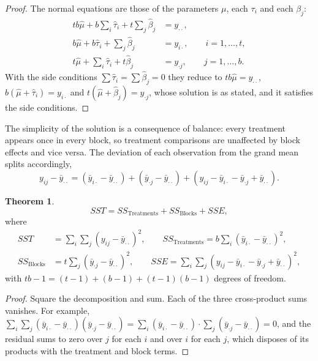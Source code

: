 \documentclass[11pt,a4paper]{article}
\numberwithin{equation}{section}
\theoremstyle{definition}
\newtheorem{thm}{Theorem}[subsection]
\begin{document}
\begin{proof}
The normal equations are those of the parameters $\mu$, each $\tau_i$ and each $\beta_j$:
\begin{align*}
tb\hat\mu + b\sum_i\hat\tau_i + t\sum_j\hat\beta_j &= y_{\cdot\cdot} , \\
b\hat\mu + b\hat\tau_i + \sum_j\hat\beta_j &= y_{i\cdot} , \qquad i = 1, \dots, t , \\
t\hat\mu + \sum_i\hat\tau_i + t\hat\beta_j &= y_{\cdot j} , \qquad j = 1, \dots, b .
\end{align*}
With the side conditions $\sum\hat\tau_i = \sum\hat\beta_j = 0$ they reduce to $tb\hat\mu = y_{\cdot\cdot}$, $b(\hat\mu + \hat\tau_i) = y_{i\cdot}$ and $t(\hat\mu + \hat\beta_j) = y_{\cdot j}$, whose solution is as
stated, and it satisfies the side conditions.
\end{proof}

The simplicity of the solution is a consequence of balance: every treatment appears once in every block, so treatment comparisons are
unaffected by block effects and vice versa. The deviation of each observation from the grand mean splits accordingly,
\[
y_{ij} - \bar y_{\cdot\cdot} = (\bar y_{i\cdot} - \bar y_{\cdot\cdot}) + (\bar y_{\cdot j} - \bar y_{\cdot\cdot}) + (y_{ij} - \bar y_{i\cdot} - \bar y_{\cdot j} + \bar y_{\cdot\cdot}) .
\]

\begin{thm}\label{thm:rcbd-partition}
\[
SST = SS_{\mathrm{Treatments}} + SS_{\mathrm{Blocks}} + SSE ,
\]
where
\begin{align*}
SST &= \sum_i\sum_j(y_{ij} - \bar y_{\cdot\cdot})^2 , \qquad SS_{\mathrm{Treatments}} = b\sum_i(\bar y_{i\cdot} - \bar y_{\cdot\cdot})^2 , \\
SS_{\mathrm{Blocks}} &= t\sum_j(\bar y_{\cdot j} - \bar y_{\cdot\cdot})^2 , \qquad SSE = \sum_i\sum_j(y_{ij} - \bar y_{i\cdot} - \bar y_{\cdot j} + \bar y_{\cdot\cdot})^2 ,
\end{align*}
with $tb - 1 = (t - 1) + (b - 1) + (t - 1)(b - 1)$ degrees of freedom.
\end{thm}

\begin{proof}
Square the decomposition and sum. Each of the three cross-product sums vanishes. For example,
$\sum_i\sum_j(\bar y_{i\cdot} - \bar y_{\cdot\cdot})(\bar y_{\cdot j} - \bar y_{\cdot\cdot}) = \sum_i(\bar y_{i\cdot} - \bar y_{\cdot\cdot})\cdot\sum_j(\bar y_{\cdot j} - \bar y_{\cdot\cdot}) = 0$, and the residual sums to zero over $j$ for each $i$ and over $i$ for
each $j$, which disposes of its products with the treatment and block terms.
\end{proof}
\end{document}
